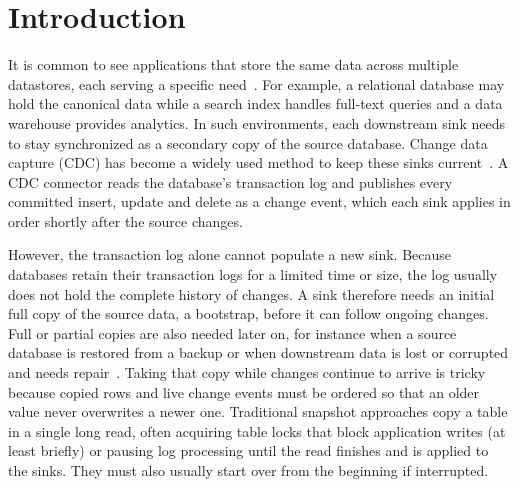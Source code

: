 \documentclass[sigconf,nonacm,10pt]{acmart}
\begin{document}
\maketitle

\section{Introduction}\label{sec:intro}

It is common to see applications that store the same data across multiple datastores, each serving
a specific need~\cite{kleppmann2019olep,laigner2021microservices}. For example, a relational database
may hold the canonical data while a search index handles full-text queries and a
data warehouse provides analytics. In such environments, each downstream sink needs to
stay synchronized as a secondary copy of the source database. Change data capture
(CDC) has become a widely used method to keep these sinks current~\cite{kleppmann2019olep,andreakis2020dblog}. A CDC connector
reads the database's transaction log and publishes every committed insert,
update and delete as a change event, which each sink applies in order shortly
after the source changes.

However, the transaction log alone cannot populate a new sink. Because databases
retain their transaction logs for a limited time or size, the log usually does not hold the
complete history of changes. A sink therefore needs an initial full copy of the
source data, a bootstrap, before it can follow ongoing changes. Full or partial
copies are also needed later on, for instance when a source database is restored
from a backup or when downstream data is lost or corrupted and needs
repair~\cite{andreakis2020dblog}.
Taking that copy while changes continue to arrive is tricky because copied rows
and live change events must be ordered so that an older value never overwrites a
newer one. Traditional snapshot approaches copy a table in a single long read,
often acquiring table locks that block application writes (at least briefly) or 
pausing log processing until the read finishes and is applied to the sinks. 
They must also usually start over from the beginning if interrupted.
\end{document}
